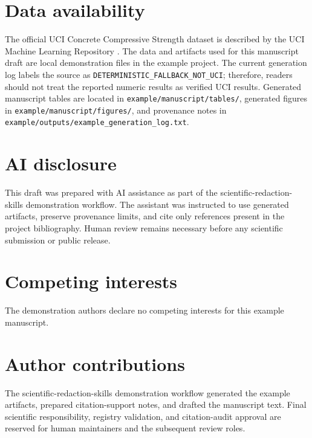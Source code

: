 \section*{Data availability}
\label{sec:data_availability}

The official UCI Concrete Compressive Strength dataset is described by the UCI Machine Learning Repository \citep{Yeh1998_UCIConcreteDataset}. The data and artifacts used for this manuscript draft are local demonstration files in the example project. The current generation log labels the source as \texttt{DETERMINISTIC\_FALLBACK\_NOT\_UCI}; therefore, readers should not treat the reported numeric results as verified UCI results. Generated manuscript tables are located in \texttt{example/manuscript/tables/}, generated figures in \texttt{example/manuscript/figures/}, and provenance notes in \texttt{example/outputs/example\_generation\_log.txt}.

\section*{AI disclosure}
\label{sec:ai_disclosure}

This draft was prepared with AI assistance as part of the scientific-redaction-skills demonstration workflow. The assistant was instructed to use generated artifacts, preserve provenance limits, and cite only references present in the project bibliography. Human review remains necessary before any scientific submission or public release.

\section*{Competing interests}
\label{sec:competing_interests}

The demonstration authors declare no competing interests for this example manuscript.

\section*{Author contributions}
\label{sec:author_contributions}

The scientific-redaction-skills demonstration workflow generated the example artifacts, prepared citation-support notes, and drafted the manuscript text. Final scientific responsibility, registry validation, and citation-audit approval are reserved for human maintainers and the subsequent review roles.
